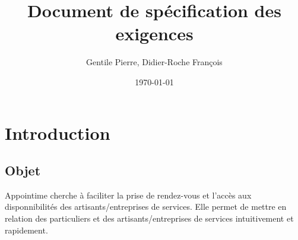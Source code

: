 \documentclass{article}
\author{Gentile Pierre, Didier-Roche François}
\date{\today}
\title{Document de spécification des exigences}
\begin{document}
\maketitle

\newpage
\tableofcontents
\newpage


\section{Introduction}
\subsection{Objet}
Appointime cherche à faciliter la prise de rendez-vous et l’accès aux disponnibilités des artisants/entreprises de services.
Elle permet de mettre en relation des particuliers et des artisants/entreprises de services intuitivement et rapidement.
\end{document}
